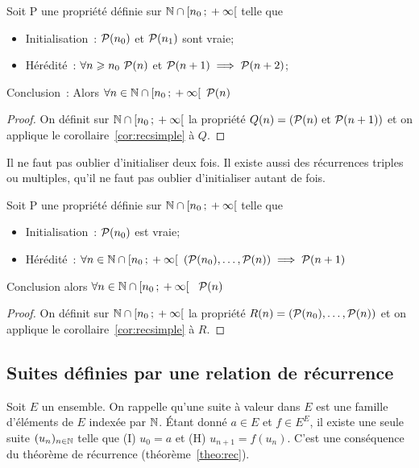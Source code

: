 \begin{cor}
  \label{cor:recdouble}
  Soit P une propriété définie sur \(\N\cap \intervallefo{n_0}{+\infty}\) telle
  que
  \begin{itemize}
    \item Initialisation~: \(\P(n_0)\) et \(\P(n_1)\) sont vraie;
    \item Hérédité~: \(\forall n\geqslant n_0 \ \P(n)\) et \(\P(n + 1) \implies
      \P(n + 2)\);
  \end{itemize}
Conclusion~: Alors \(\forall n \in \N\cap \intervallefo{n_0}{+\infty} \ \P(n)\)
\end{cor}

\begin{proof}
  On définit sur \(\N\cap \intervallefo{n_0}{+\infty}\) la propriété \(Q(n) =
  (\P(n) \text{~et~} \P(n + 1))\) et on applique le
  corollaire~\ref{cor:recsimple} à \(Q\).
\end{proof}

Il ne faut pas oublier d'initialiser deux fois. Il existe aussi des récurrences
triples ou multiples, qu'il ne faut pas oublier d'initialiser autant de fois.

\begin{cor}
  \label{cor:recforte}
  Soit P une propriété définie sur \(\N\cap \intervallefo{n_0}{+\infty}\) telle
  que
  \begin{itemize}
    \item Initialisation~: \(\P(n_0)\) est vraie;
    \item Hérédité~: \(\forall n \in \N\cap \intervallefo{n_0}{+\infty} \
      (\P(n_0), \ldots, \P(n)) \implies \P(n + 1)\)
  \end{itemize}
  Conclusion alors \(\forall n \in \N\cap \intervallefo{n_0}{+\infty}\ \ \P(n)\)
\end{cor}

\begin{proof}
  On définit sur \(\N\cap \intervallefo{n_0}{+\infty}\) la propriété \(R(n) =
  (\P(n_0), \ldots, \P(n))\) et on applique le corollaire~\ref{cor:recsimple} à
  \(R\).
\end{proof}

\subsection{Suites définies par une relation de récurrence}

Soit \(E\) un ensemble. On rappelle qu'une suite à valeur dans \(E\) est une
famille d'éléments de \(E\) indexée par \(\N\). Étant donné \(a\in E\) et \(f\in
E^E\), il existe une seule suite \((u_n)_{n\in\N}\) telle que (I) \(u_0 = a\) et
(H) \(u_{n + 1} = f(u_n)\). C'est une conséquence du théorème de récurrence
(théorème~\ref{theo:rec}).

